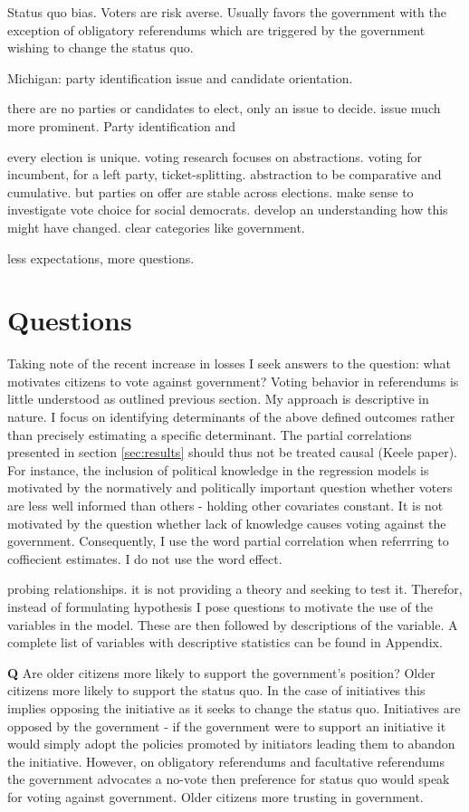 \documentclass[11pt,a4paper]{article}\usepackage[]{graphicx}\usepackage[]{color}
\begin{document}
Status quo bias. Voters are risk averse. Usually favors the government with the exception of obligatory referendums which are triggered by the government wishing to change the status quo.

Michigan: party identification issue and candidate orientation. 

there are no parties or candidates to elect, only an issue to decide. issue much more prominent. Party identification and 

every election is unique. voting research focuses on abstractions. voting for incumbent, for a left party, ticket-splitting. abstraction to be comparative and cumulative. but parties on offer are stable across elections. make sense to investigate vote choice for social democrats. develop an understanding how this might have changed. clear categories like government.

less expectations, more questions. 

\section{Questions}

Taking note of the recent increase in losses I seek answers to the question: what motivates citizens to vote against government? Voting behavior in referendums is little understood as outlined previous section.
My approach is descriptive in nature. I focus on identifying determinants of the above defined outcomes rather than precisely estimating a specific determinant. The partial correlations presented in section \ref{sec:results} should thus not be treated causal (Keele paper). For instance, the inclusion of political knowledge in the regression models is motivated by the normatively and politically important question whether voters are less well informed than others - holding other covariates constant. It is not motivated by the question whether lack of knowledge causes voting against the government. Consequently, I use the word partial correlation when referrring to coffiecient estimates. I do not use the word effect. 

probing relationships. it is not providing a theory and seeking to test it. Therefor, instead of formulating hypothesis I pose questions to motivate the use of the variables in the model. These are then followed by descriptions of the variable. A complete list of variables with descriptive statistics can be found in Appendix.

\textbf{Q} Are older citizens more likely to support the government's position?
Older citizens more likely to support the status quo. In the case of initiatives this implies opposing the initiative as it seeks to change the status quo. Initiatives are opposed by the government %
- if the government were to support an initiative it would simply adopt the policies promoted by initiators leading them to abandon the initiative.
However, on obligatory referendums and facultative referendums the government advocates a no-vote %
then preference for status quo would speak for voting against government.
Older citizens more trusting in government.
\end{document}
